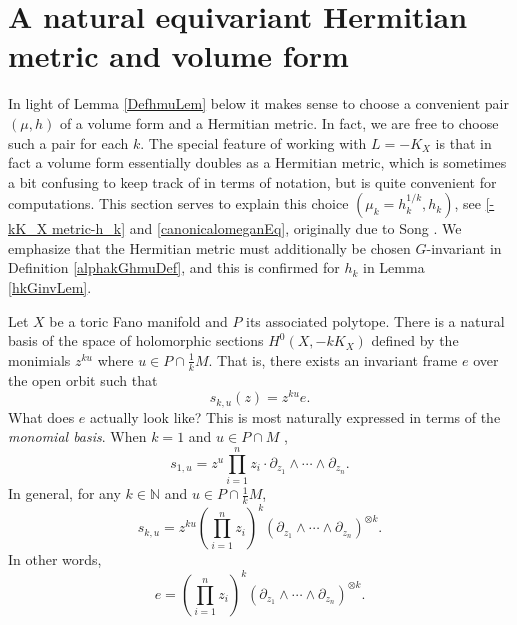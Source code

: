 \documentclass{article}
\newcommand{\NN}{{\mathbb N}}
\renewcommand{\>}{\rightarrow}
\theoremstyle{plain}
\theoremstyle{definition}
\newcommand{\beq}{\begin{equation}}
\newcommand{\eeq}{\end{equation}}
\def\lb#1{\label{#1}}
\begin{document}
\section{A natural equivariant Hermitian metric and volume form}
\lb{NaturalvolumeformSec}
In light of Lemma \ref{DefhmuLem} below it makes sense to choose
a convenient pair $(\mu,h)$ of a volume form and a Hermitian metric. 
In fact, we are free to choose such
a pair for each $k$. The special feature of working with $L=-K_X$
is that in fact a volume form essentially doubles as a Hermitian metric,
which is sometimes a bit confusing to keep track of in terms of
notation, but is quite convenient for computations. 
This section serves to explain this choice $(\mu_k=h_k^{1/k},h_k)$,
see \eqref{-kK_X metric-h_k} and \eqref{canonicalomeganEq},
originally due to Song \cite[Lemma 4.3]{Song}.
We emphasize that 
the Hermitian metric must additionally be chosen $G$-invariant in Definition \ref{alphakGhmuDef}, 
and this is confirmed for $h_k$ in Lemma \ref{hkGinvLem}.

Let $X$ be a toric Fano manifold and $P$ its associated polytope. 
There is a natural basis of the space of holomorphic sections $H^0(X,-kK_X)$ defined by the monimials $z^{ku}$ where $u\in P\cap\frac{1}{k} M$. 
That is, there exists an invariant frame $e$ over the open orbit such that 
\beq
\lb{skuEq}
s_{k,u}(z)=z^{ku}e.
\eeq
What does $e$ actually look like?
This is most naturally
expressed in terms of the {\it monomial basis}. When $k=1$ and $u\in P\cap M$
\cite[\S4.3]{Ful},
$$
s_{1,u}=z^u\prod_{i=1}^nz_i\cdot\partial_{z_1}\wedge\cdots\wedge\partial_{z_n}.
$$
In general, for any $k\in\NN$ and $u\in P\cap \frac1k M$,
\begin{equation}\label{-kK_X sections}
    s_{k,u}=z^{ku}\left(\prod_{i=1}^nz_i\right)^k(\partial_{z_1}\wedge\cdots\wedge\partial_{z_n})^{\otimes k}.
\end{equation}
In other words,
\begin{equation}\label{whatiseEq}
    e=\left(\prod_{i=1}^nz_i\right)^k(\partial_{z_1}\wedge\cdots\wedge\partial_{z_n})^{\otimes k}.
\end{equation}
\end{document}
